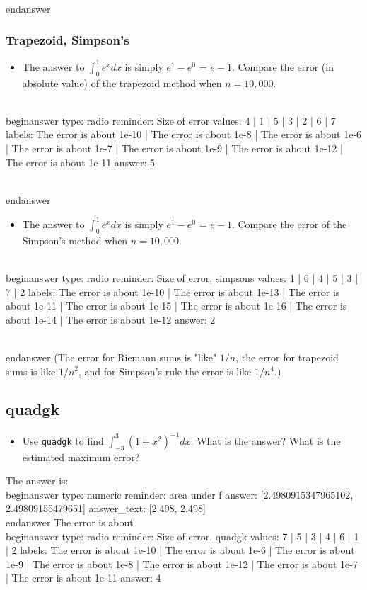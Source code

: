 \documentclass[12pt]{article}
\begin{document}
\\end{answer}
\subsubsection{Trapezoid, Simpson's}\begin{itemize}\item The answer to $\int_0^1 e^x dx$ is simply $e^1 - e^0$ =   $e-1$. Compare the error (in absolute value) of the trapezoid method when $n=10,000$.\end{itemize}
\\begin{answer}
type: radio
reminder: Size of error
values: 4 | 1 | 5 | 3 | 2 | 6 | 7
labels: The error is about 1e-10 | The error is about 1e-8 | The error is about 1e-6 | The error is about 1e-7 | The error is about 1e-9 | The error is about 1e-12 | The error is about 1e-11
answer: 5

\\end{answer}
\begin{itemize}\item The answer to $\int_0^1 e^x dx$ is simply $e^1 - e^0$ =   $e-1$. Compare the error of the Simpson's method when $n=10,000$.\end{itemize}
\\begin{answer}
type: radio
reminder: Size of error, simpsons
values: 1 | 6 | 4 | 5 | 3 | 7 | 2
labels: The error is about 1e-10 | The error is about 1e-13 | The error is about 1e-11 | The error is about 1e-15 | The error is about 1e-16 | The error is about 1e-14 | The error is about 1e-12
answer: 2

\\end{answer}
\newline
(The error for Riemann sums is "like" $1/n$, the error for trapezoid sums is like $1/n^2$, and for Simpson's rule the error is like $1/n^4$.)\subsection{quadgk}\begin{itemize}\item Use \texttt{quadgk} to find $\int_{-3}^{3} (1 + x^2)^{-1} dx$. What is the answer? What is the estimated maximum error?\end{itemize}\newline
The answer is:
\\begin{answer}
    type: numeric
    reminder: area under f
    answer: [2.4980915347965102, 2.49809155479651]
    answer_text: [2.498, 2.498] 
\\end{answer}
\newline
The error is about
\\begin{answer}
type: radio
reminder: Size of error, quadgk
values: 7 | 5 | 3 | 4 | 6 | 1 | 2
labels: The error is about 1e-10 | The error is about 1e-6 | The error is about 1e-9 | The error is about 1e-8 | The error is about 1e-12 | The error is about 1e-7 | The error is about 1e-11
answer: 4
\end{document}
